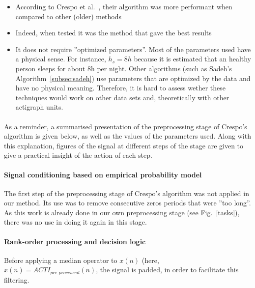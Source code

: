 \documentclass[a4paper,12pt]{article}
\begin{document}
\begin{itemize}
\item According to Crespo et al.~\cite{Crespo2012}, their algorithm was more performant when compared to other (older) methods
\item Indeed, when tested it was the method that gave the best results
\item It does not require ''optimized parameters''. Most of the parameters used have a physical sense. For instance, $h_s = 8h$ because it is estimated that an healthy person sleeps for about 8h per night. Other algorithms (such as Sadeh's Algorithm~\ref{subsec:sadeh}) use parameters that are optimized by the data and have no physical meaning. Therefore, it is hard to assess wether these techniques would work on other data sets and, theoretically with other actigraph units.
\end{itemize}


\paragraph{}
As a reminder, a summarised presentation of the preprocessing stage of Crespo's algorithm is given below, as well as the values of the parameters used. Along with this explanation, figures of the signal at different steps of the stage are given to give a practical insight of the action of each step.

\paragraph{Signal conditioning based on empirical probability model\\}
The first step of the preprocessing stage of Crespo's algorithm was not applied in our method. Its use was to remove consecutive zeros periods that were ''too long''. As this work is already done in our own preprocessing stage (see Fig.~\ref{tasks}), there was no use in doing it again in this stage.

\paragraph{Rank-order processing and decision logic\\}
Before applying a median operator to $x(n)$ (here, $x(n) = ACTI_{pre\_processed}(n)$, the signal is padded, in order to facilitate this filtering. 
\end{document}
